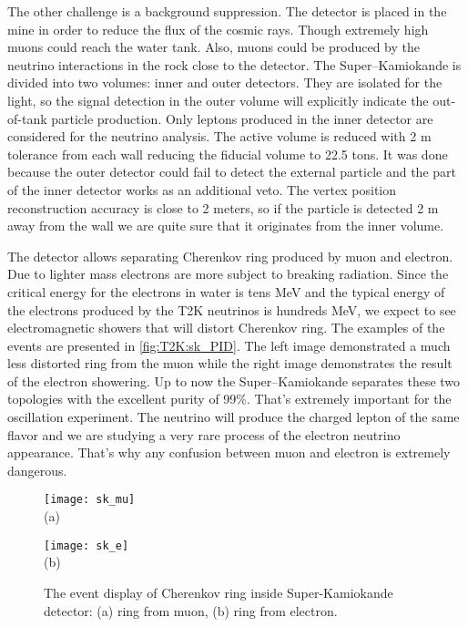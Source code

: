 \documentclass[../main.tex]{subfiles}
\begin{document}
The other challenge is a background suppression. The detector is placed in the mine in order to reduce the flux of the cosmic rays. Though extremely high muons could reach the water tank. Also, muons could be produced by the neutrino interactions in the rock close to the detector. The Super--Kamiokande is divided into two volumes: inner and outer detectors. They are isolated for the light, so the signal detection in the outer volume will explicitly indicate the out-of-tank particle production. Only leptons produced in the inner detector are considered for the neutrino analysis. The active volume is reduced with 2 m tolerance from each wall reducing the fiducial volume to 22.5 tons. It was done because the outer detector could fail to detect the external particle and the part of the inner detector works as an additional veto. The vertex position reconstruction accuracy is close to 2 meters, so if the particle is detected 2 m away from the wall we are quite sure that it originates from the inner volume.

The detector allows separating Cherenkov ring produced by muon and electron. Due to lighter mass electrons are more subject to breaking radiation. Since the critical energy for the electrons in water is tens MeV and the typical energy of the electrons produced by the T2K neutrinos is hundreds MeV, we expect to see electromagnetic showers that will distort Cherenkov ring. The examples of the events are presented in \autoref{fig:T2K:sk_PID}. The left image demonstrated a much less distorted ring from the muon while the right image demonstrates the result of the electron showering. Up to now the Super--Kamiokande separates these two topologies with the excellent purity of 99\%. That's extremely important for the oscillation experiment. The neutrino will produce the charged lepton of the same flavor and we are studying a very rare process of the electron neutrino appearance. That's why any confusion between muon and electron is extremely dangerous.

\begin{figure}[!ht]
  \centering
  \begin{minipage}{0.49\linewidth}
    \centering
    \texttt{[image: sk\_mu]} \\ (a)
  \end{minipage}
  \begin{minipage}{0.49\linewidth}
    \centering
    \texttt{[image: sk\_e]} \\ (b)
  \end{minipage}
    \caption{The event display of Cherenkov ring inside Super-Kamiokande detector: (a) ring from muon, (b) ring from electron.}
    \label{fig:T2K:sk_PID}
\end{figure}
\end{document}
